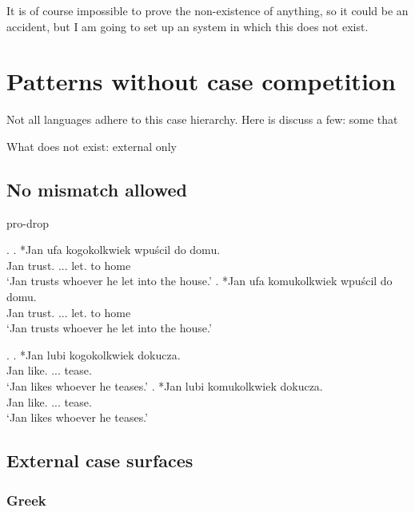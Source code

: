 It is of course impossible to prove the non-existence of anything, so it could be an accident, but I am going to set up an system in which this does not exist.



\section{Patterns without case competition}

Not all languages adhere to this case hierarchy. Here is discuss a few: some that

What does not exist: external only

\subsection{No mismatch allowed}

pro-drop



\ex.
\ag. *Jan ufa kogokolkwiek wpuścil do domu.\\
Jan trust. ... let. to home\\
`Jan trusts whoever he let into the house.'
\bg. *Jan ufa komukolkwiek wpuścil do domu.\\
Jan trust. ... let. to home\\
`Jan trusts whoever he let into the house.'

\ex.
\ag. *Jan lubi kogokolkwiek dokucza.\\
Jan like. ... tease.\\
`Jan likes whoever he teases.'
\bg. *Jan lubi komukolkwiek dokucza.\\
Jan like. ... tease.\\
`Jan likes whoever he teases.'



\subsection{External case surfaces}


\subsubsection{Greek}

